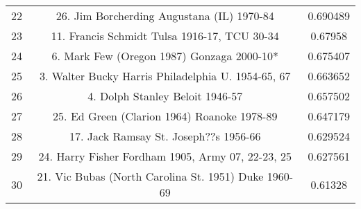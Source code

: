 \documentclass{mcmthesis}
\begin{document}
\begin{appendices}
\begin{longtable}{ccc}
    22    & 26. Jim Borcherding Augustana (IL) 1970-84 & 0.690489 \\
    23    & 11. Francis Schmidt Tulsa 1916-17,  TCU 30-34 & 0.67958 \\
    24    & 6. Mark Few (Oregon 1987) Gonzaga 2000-10* & 0.675407 \\
    25    & 3. Walter Bucky Harris Philadelphia U. 1954-65, 67 & 0.663652 \\
    26    & 4. Dolph Stanley  Beloit 1946-57 & 0.657502 \\
    27    & 25. Ed Green (Clarion 1964) Roanoke 1978-89 & 0.647179 \\
    28    & 17. Jack Ramsay  St. Joseph??s 1956-66  & 0.629524 \\
    29    & 24. Harry Fisher Fordham 1905,  Army 07, 22-23, 25  & 0.627561 \\
    30    & 21. Vic Bubas (North Carolina St. 1951) Duke 1960-69  & 0.61328 \\
\end{longtable}
\end{appendices}
\end{document}
